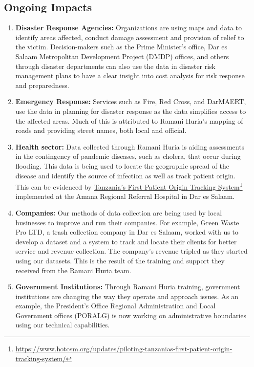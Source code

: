 \documentclass[a4paper,12pt,twoside]{article}
\begin{document}
\subsection{Ongoing Impacts}
\bigskip
\begin{mdframed}[hidealllines=true,backgroundcolor=RHgreen!10,innerleftmargin=6pt,innerrightmargin=6pt,leftmargin=-3pt,rightmargin=-3pt]
\begin{enumerate}
\item \textbf{Disaster Response Agencies:} Organizations are using maps and data to identify areas affected, conduct damage assessment and provision of relief to the victim. Decision-makers such as the Prime Minister's office, Dar es Salaam Metropolitan Development Project (DMDP) offices, and others through disaster departments can also use the data in disaster risk management plans to have a clear insight into cost analysis for risk response and preparedness.
\item \textbf{Emergency Response:} Services such as Fire, Red Cross, and DarMAERT, use the data in planning for disaster response as the data simplifies access to the affected areas. Much of this is attributed to Ramani Huria's mapping of roads and  providing street names, both local and official.
\item \textbf{Health sector:} Data collected through Ramani Huria is aiding assessments in the contingency of pandemic diseases, such as cholera, that occur during flooding. This data is being used to locate the geographic spread of the disease and identify the source of infection as well as track patient origin. This can be evidenced by \href{https://www.hotosm.org/updates/piloting-tanzanias-first-patient-origin-tracking-system/}{Tanzania’s First Patient Origin Tracking System}\footnote{\url{https://www.hotosm.org/updates/piloting-tanzanias-first-patient-origin-tracking-system/}} implemented at the Amana Regional Referral Hospital in Dar es Salaam.
\item \textbf{Companies:} Our methods of data collection are being used by local businesses to improve and run their companies. For example, Green Waste Pro LTD, a trash collection company in Dar es Salaam, worked with us to develop a dataset and a system to track and locate their clients for better service and revenue collection. The company’s revenue tripled as they started using our datasets. This is the result of the training and support they received from the Ramani Huria team.
\item \textbf{Government Institutions:} Through Ramani Huria training, government institutions are changing the way they operate and approach issues. As an example, the President's Office Regional Administration and Local Government offices (PORALG) is now working on administrative boundaries using our technical capabilities.

\end{enumerate}
\end{mdframed}
\end{document}
